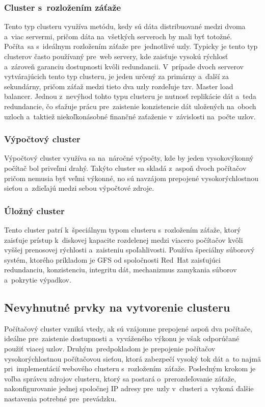 \subsubsection{Cluster s~rozložením záťaže}
Tento typ clusteru využíva metódu, kedy sú dáta distribuované medzi dvoma a~viac servermi, pričom dáta na~všetkých serveroch by mali byť totožné. \mbox{Počíta}~sa s~ideálnym rozložením záťaže pre~jednotlivé uzly. Typicky je tento typ clusterov často používaný pre~web servery, kde zaisťuje vysokú rýchlosť a~zároveň garanciu dostupnosti kvôli redundancii. V~prípade dvoch serverov vytvárajúcich tento typ clusteru, je jeden určený za primárny a~ďalší za sekundárny, pričom záťaž medzi tieto dva uzly rozdeľuje tzv. Master load balancer. Jednou z~nevýhod tohto typu clusteru je nutnosť replikácie dát a~teda redundancie, čo sťažuje prácu pre~zaistenie konzistencie dát uložených na~oboch uzloch a~taktiež niekoľkonásobné finančné zaťaženie v~závislosti na~počte uzlov. \cite{cluster-book}

\subsubsection*{Výpočtový cluster} Výpočtový cluster využíva sa na~náročné výpočty, kde by jeden vysokovýkonný počítač bol priveľmi drahý. Takýto cluster sa skladá z~aspoň dvoch počítačov pričom nemusia byť veľmi výkonné, no sú navzájom prepojené vysokorýchlostnou sieťou a~zdieľajú medzi sebou výpočtové zdroje. \cite{cluster-book}

\subsubsection{Úložný cluster}
 Tento cluster patrí k~špeciálnym typom clusteru s~rozložením záťaže, ktorý zaisťuje  prístup k~diskovej kapacite rozdelenej medzi viacero počítačov kvôli vyššej prenosovej rýchlosti a~zaisteniu spoľahlivosti. Používa špeciálny súborový systém, ktorého príkladom je GFS od spoločnosti \mbox{Red Hat} zaisťujúci redundanciu, konzistenciu, integritu dát, mechanizmus zamykania súborov a~pokrytie výpadkov. \cite{cluster-book} 

\subsection*{Nevyhnutné prvky na vytvorenie clusteru}
Počítačový cluster vzniká vtedy, ak sú vzájomne prepojené aspoň dva počítače, ideálne pre~zaistenie dostupnosti a~vyváženého výkonu je však odporúčané použiť viacej uzlov. \mbox{Druhým}~predpokladom je prepojenie počítačov vysokorýchlostnou počítačovou sieťou, ktorá zabezpečí vysoký tok dát a~to najmä pri~implementácií webového clusteru s~rozložením~\mbox{záťaže}. Posledným krokom je voľba správcu zdrojov clusteru, ktorý sa postará o~prerozdeľovanie záťaže, nakonfigurovanie jednej spoločnej IP adresy pre~uzly v~clusteri a~vykoná ďalšie nastavenia potrebné pre~prevádzku. \cite{cluster-book}

